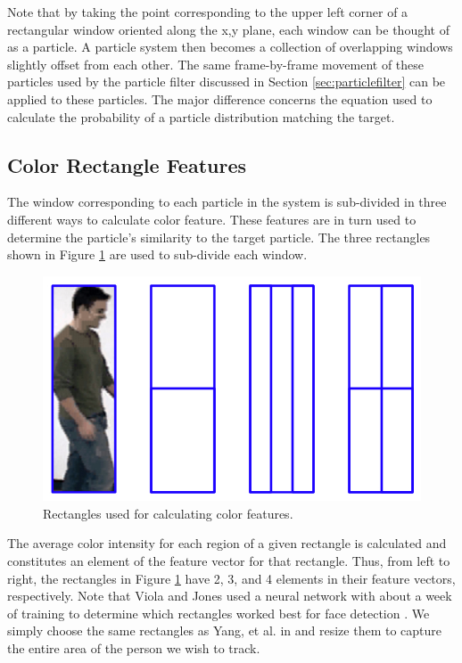 \documentclass[11pt]{article}
\begin{document}
Note that by taking the point corresponding to the upper left corner of a rectangular window oriented along the x,y plane, each window can be thought of as a particle. A particle system then becomes a collection of overlapping windows slightly offset from each other. The same frame-by-frame movement of these particles used by the particle filter discussed in Section \ref{sec:particlefilter} can be applied to these particles. The major difference concerns the equation used to calculate the probability of a particle distribution matching the target.


\subsection{Color Rectangle Features}
\label{sec:colorrects}

The window corresponding to each particle in the system is sub-divided in three different ways to calculate color feature. These features are in turn used to determine the particle's similarity to the target particle. The three rectangles shown in Figure \ref{fig:rectfeatures} are used to sub-divide each window.

\begin{figure}[H]
\centering
\includegraphics[scale=.4]{img/RectFeatures.jpg}
\caption{Rectangles used for calculating color features.}
\label{fig:rectfeatures}
\end{figure}

The average color intensity for each region of a given rectangle is calculated and constitutes an element of the feature vector for that rectangle. Thus, from left to right, the rectangles in Figure \ref{fig:rectfeatures} have 2, 3, and 4 elements in their feature vectors, respectively. Note that Viola and Jones used a neural network with about a week of training to determine which rectangles worked best for face detection \cite{facedetection}. We simply choose the same rectangles as Yang, et al. in \cite{hybrid} and resize them to capture the entire area of the person we wish to track.
\end{document}

